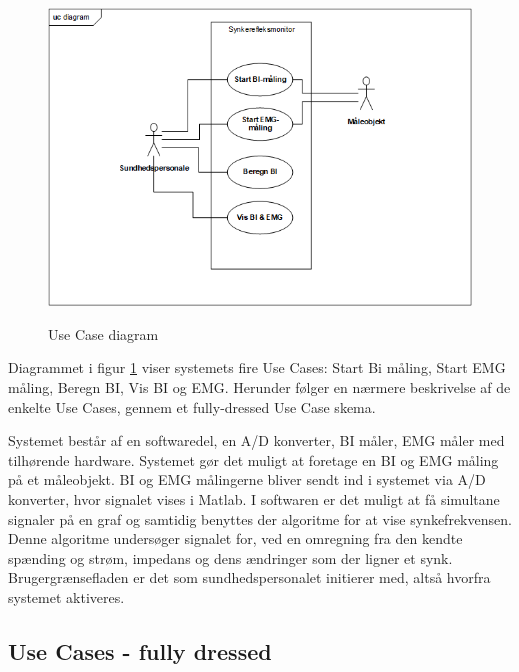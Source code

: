 \documentclass[main.tex]{subfiles}
\begin{document}
\begin{figure}[H]
\centering
{\includegraphics[width=\textwidth]
{Figure/usecasediagram}}
\caption{Use Case diagram}
\label{Use case diagram}
\end{figure}

Diagrammet i figur \ref{Use case diagram} viser systemets fire Use Cases: Start Bi måling, Start EMG måling, Beregn BI, Vis BI og EMG. Herunder følger en nærmere
beskrivelse af de enkelte Use Cases, gennem et fully-dressed Use Case skema.




Systemet består af en softwaredel, en A/D konverter, BI måler, EMG måler med tilhørende hardware.
Systemet gør det muligt at foretage en BI og EMG måling på et måleobjekt. BI og EMG målingerne bliver sendt ind i systemet via A/D konverter, hvor signalet vises i Matlab. I softwaren er det muligt at få simultane signaler på en graf og samtidig benyttes der algoritme for at vise synkefrekvensen. Denne algoritme undersøger signalet for, ved en omregning fra den kendte spænding og strøm, impedans og dens ændringer som der ligner et synk.
Brugergrænsefladen er det som sundhedspersonalet initierer med, altså hvorfra systemet aktiveres.


\subsection{Use Cases - fully dressed}
\end{document}
